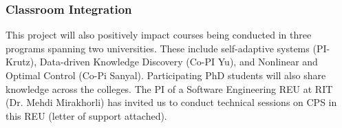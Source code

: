 \documentclass[11pt]{proposalnsf}
\newcommand{\dan}[1]{\textcolor{blue}{{\it [Dan says: #1]}}}
\begin{document}
\begin{sloppypar}



%     





\subsubsection*{Classroom Integration} %

This project will also positively impact courses being conducted in three programs spanning two universities. These include self-adaptive systems (PI-Krutz), Data-driven Knowledge Discovery (Co-PI Yu), and Nonlinear and Optimal Control (Co-Pi Sanyal). Participating PhD students will also share knowledge across the colleges. The PI of a Software Engineering REU at RIT (Dr. Mehdi Mirakhorli) has invited us to conduct technical sessions on CPS in this REU (letter of support attached).




% 









\end{sloppypar}
\end{document}
